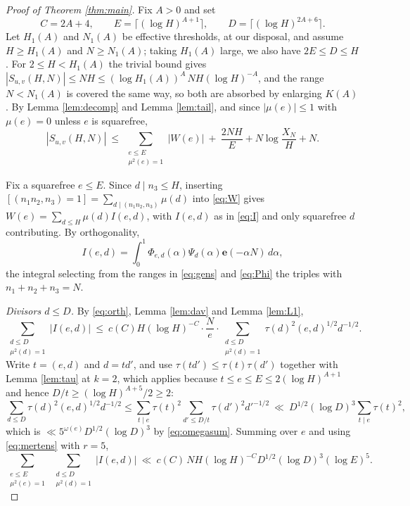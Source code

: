 \documentclass[11pt,a4paper]{article}
\theoremstyle{plain}
\theoremstyle{remark}
\newcommand{\e}[1]{\mathbf{e}\!\left(#1\right)}
\newcommand{\Suv}{S_{u,v}}
\begin{document}
\begin{proof}[Proof of Theorem \ref{thm:main}]
Fix $A>0$ and set
\begin{equation}\label{eq:param}
  C=2A+4,\qquad E=\bigl\lceil(\log H)^{A+1}\bigr\rceil,\qquad D=\bigl\lceil(\log H)^{2A+6}\bigr\rceil.
\end{equation}
Let $H_1(A)$ and $N_1(A)$ be effective thresholds, at our disposal, and assume $H\ge H_1(A)$ and
$N\ge N_1(A)$; taking $H_1(A)$ large, we also have $2E\le D\le H$. For $2\le H<H_1(A)$ the trivial bound gives
$|\Suv(H,N)|\le NH\le(\log H_1(A))^{A}\,NH(\log H)^{-A}$, and the range $N<N_1(A)$ is covered the same
way, so both are absorbed by enlarging $K(A)$. By Lemma \ref{lem:decomp} and
Lemma \ref{lem:tail}, and since $|\mu(e)|\le1$ with $\mu(e)=0$ unless $e$ is squarefree,
\begin{equation}\label{eq:split}
  |\Suv(H,N)|\ \le\ \sum_{\substack{e\le E\\ \mu^{2}(e)=1}}|W(e)|
  \ +\ \frac{2NH}{E}+N\log\frac{X_N}{H}+N.
\end{equation}

Fix a squarefree $e\le E$. Since $d\mid n_3\le H$, inserting
$[(n_1n_2,n_3)=1]=\sum_{d\mid(n_1n_2,n_3)}\mu(d)$ into \eqref{eq:W} gives
$W(e)=\sum_{d\le H}\mu(d)I(e,d)$, with $I(e,d)$ as in \eqref{eq:I} and only squarefree $d$
contributing. By orthogonality,
\begin{equation}\label{eq:orth}
  I(e,d)=\int_0^1\Phi_{e,d}(\alpha)\Psi_d(\alpha)\e{-\alpha N}\,d\alpha ,
\end{equation}
the integral selecting from the ranges in \eqref{eq:gens} and \eqref{eq:Phi} the triples with
$n_1+n_2+n_3=N$.

\emph{Divisors $d\le D$.} By \eqref{eq:orth}, Lemma \ref{lem:dav} and Lemma \ref{lem:L1},
\[
  \sum_{\substack{d\le D\\ \mu^{2}(d)=1}}|I(e,d)|\ \le\ c(C)H(\log H)^{-C}\cdot\frac Ne\cdot
  \sum_{\substack{d\le D\\ \mu^{2}(d)=1}}\tau(d)^{2}(e,d)^{1/2}d^{-1/2}.
\]
Write $t=(e,d)$ and $d=td'$, and use $\tau(td')\le\tau(t)\tau(d')$ together with Lemma \ref{lem:tau}
at $k=2$, which applies because $t\le e\le E\le2(\log H)^{A+1}$ and hence
$D/t\ge(\log H)^{A+5}/2\ge2$:
\[
  \sum_{d\le D}\tau(d)^{2}(e,d)^{1/2}d^{-1/2}
  \le\sum_{t\mid e}\tau(t)^{2}\sum_{d'\le D/t}\tau(d')^{2}d'^{-1/2}
  \ \ll\ D^{1/2}(\log D)^{3}\sum_{t\mid e}\tau(t)^{2},
\]
which is $\ll 5^{\omega(e)}D^{1/2}(\log D)^{3}$ by \eqref{eq:omegasum}. Summing over $e$ and using
\eqref{eq:mertens} with $r=5$,
\begin{equation}\label{eq:smalld}
  \sum_{\substack{e\le E\\ \mu^{2}(e)=1}}\ \sum_{\substack{d\le D\\ \mu^{2}(d)=1}}|I(e,d)|
  \ \ll\ c(C)\,NH(\log H)^{-C}D^{1/2}(\log D)^{3}(\log E)^{5}.
\end{equation}


\end{proof}
\end{document}
